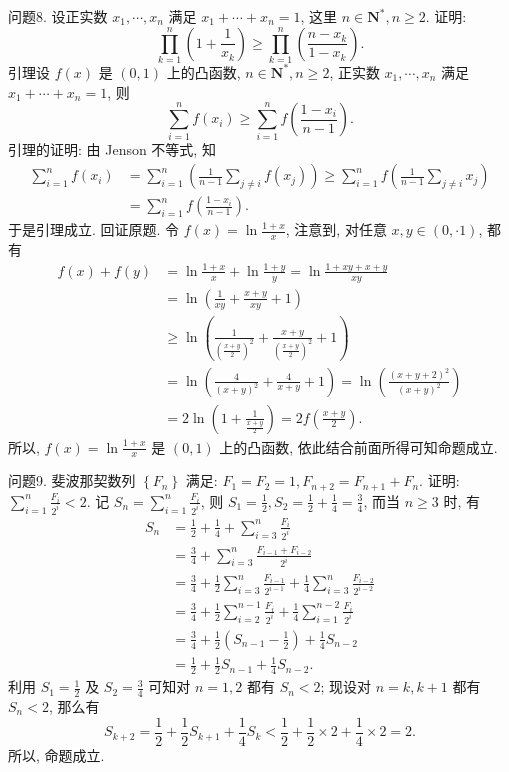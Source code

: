 问题8. 设正实数 $x_1, \cdots, x_n$ 满足 $x_1+\cdots+x_n=1$, 这里 $n \in \mathbf{N}^*, n \geqslant 2$. 证明:
$$
\prod_{k=1}^n\left(1+\frac{1}{x_k}\right) \geqslant \prod_{k=1}^n\left(\frac{n-x_k}{1-x_k}\right) .
$$
引理设 $f(x)$ 是 $(0,1)$ 上的凸函数, $n \in \mathbf{N}^*, n \geqslant 2$, 正实数 $x_1, \cdots, x_n$ 满足 $x_1+\cdots+x_n=1$, 则
$$
\sum_{i=1}^n f\left(x_i\right) \geqslant \sum_{i=1}^n f\left(\frac{1-x_i}{n-1}\right) .
$$
引理的证明: 由 Jenson 不等式, 知
$$
\begin{aligned}
\sum_{i=1}^n f\left(x_i\right) & =\sum_{i=1}^n\left(\frac{1}{n-1} \sum_{j \neq i} f\left(x_j\right)\right) \geqslant \sum_{i=1}^n f\left(\frac{1}{n-1} \sum_{j \neq i} x_j\right) \\
& =\sum_{i=1}^n f\left(\frac{1-x_i}{n-1}\right) .
\end{aligned}
$$
于是引理成立.
回证原题.
令 $f(x)=\ln \frac{1+x}{x}$, 注意到, 对任意 $x, y \in(0, \cdot 1)$, 都有
$$
\begin{aligned}
f(x)+f(y) & =\ln \frac{1+x}{x}+\ln \frac{1+y}{y}=\ln \frac{1+x y+x+y}{x y} \\
& =\ln \left(\frac{1}{x y}+\frac{x+y}{x y}+1\right) \\
& \geqslant \ln \left(\frac{1}{\left(\frac{x+y}{2}\right)^2}+\frac{x+y}{\left(\frac{x+y}{2}\right)^2}+1\right) \\
& =\ln \left(\frac{4}{(x+y)^2}+\frac{4}{x+y}+1\right)=\ln \left(\frac{(x+y+2)^2}{(x+y)^2}\right) \\
& =2 \ln \left(1+\frac{1}{\frac{x+y}{2}}\right)=2 f\left(\frac{x+y}{2}\right) .
\end{aligned}
$$
所以, $f(x)=\ln \frac{1+x}{x}$ 是 $(0,1)$ 上的凸函数, 依此结合前面所得可知命题成立.



问题9. 斐波那契数列 $\left\{F_n\right\}$ 满足: $F_1=F_2=1, F_{n+2}=F_{n+1}+F_n$. 证明: $\sum_{i=1}^n \frac{F_i}{2^i}<2$.
记 $S_n=\sum_{i=1}^n \frac{F_i}{2^i}$, 则 $S_1=\frac{1}{2}, S_2=\frac{1}{2}+\frac{1}{4}=\frac{3}{4}$, 而当 $n \geqslant 3$ 时, 有
$$
\begin{aligned}
S_n & =\frac{1}{2}+\frac{1}{4}+\sum_{i=3}^n \frac{F_i}{2^i} \\
& =\frac{3}{4}+\sum_{i=3}^n \frac{F_{i-1}+F_{i-2}}{2^i} \\
& =\frac{3}{4}+\frac{1}{2} \sum_{i=3}^n \frac{F_{i-1}}{2^{i-1}}+\frac{1}{4} \sum_{i=3}^n \frac{F_{i-2}}{2^{i-2}} \\
& =\frac{3}{4}+\frac{1}{2} \sum_{i=2}^{n-1} \frac{F_i}{2^i}+\frac{1}{4} \sum_{i=1}^{n-2} \frac{F_i}{2^i} \\
& =\frac{3}{4}+\frac{1}{2}\left(S_{n-1}-\frac{1}{2}\right)+\frac{1}{4} S_{n-2} \\
& =\frac{1}{2}+\frac{1}{2} S_{n-1}+\frac{1}{4} S_{n-2} .
\end{aligned}
$$
利用 $S_1=\frac{1}{2}$ 及 $S_2=\frac{3}{4}$ 可知对 $n=1,2$ 都有 $S_n<2$; 现设对 $n=k, k+1$ 都有 $S_n<2$, 那么有
$$
S_{k+2}=\frac{1}{2}+\frac{1}{2} S_{k+1}+\frac{1}{4} S_k<\frac{1}{2}+\frac{1}{2} \times 2+\frac{1}{4} \times 2=2 .
$$
所以, 命题成立.



